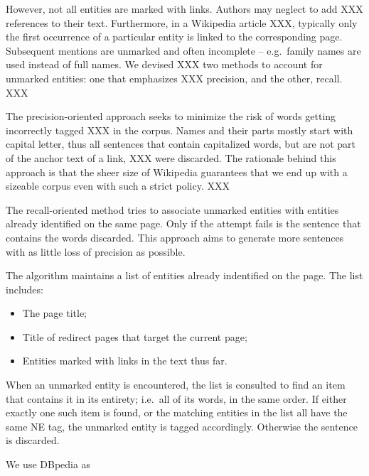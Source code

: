 \documentclass[11pt]{article}
\begin{document}
However, not all entities are marked with links. Authors may neglect to add XXX references to their text. Furthermore, in a Wikipedia article XXX, typically only the first occurrence of a particular entity is linked to the corresponding page. Subsequent mentions are unmarked and often incomplete -- e.g.~family names are used instead of full names. We devised XXX two methods to account for unmarked entities: one that emphasizes XXX precision, and the other, recall. XXX


The precision-oriented approach seeks to minimize the risk of words getting incorrectly tagged XXX in the corpus. Names and their parts mostly start with capital letter, thus 
all sentences that contain capitalized words, but are not part of the anchor text of a link, XXX were discarded. The rationale behind this approach is that the sheer size of Wikipedia guarantees that we end up with a sizeable corpus even with such a strict policy. XXX

The recall-oriented method tries to associate unmarked entities with entities already identified on the same page. Only if the attempt fails is the sentence that contains the words discarded. 
This approach aims to generate more sentences with as little loss of precision as possible. 

The algorithm maintains a list of entities already indentified on the page. The list includes:
\begin{itemize}
\item The page title; %
\item Title of redirect pages that target the current page; %
\item Entities marked with links in the text thus far.
\end{itemize}

When an unmarked entity is encountered, the list is consulted to find an item that contains it in its entirety; i.e.~all of its words, in the same order. If either exactly one such item is found, or the matching entities in the list all have the same NE tag, the unmarked entity is tagged accordingly. Otherwise the sentence is discarded.


We use DBpedia as 
\end{document}
